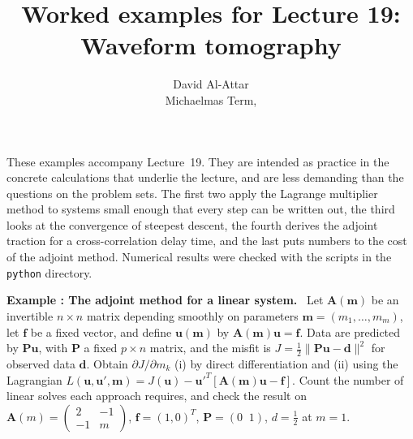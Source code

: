 \documentclass[a4paper,12pt]{paper}
\title{Worked examples for Lecture 19: Waveform tomography}
\author{David Al-Attar \\ Michaelmas Term, \the\year}
\newcounter{example}
\renewenvironment{example}[1]{%
  \refstepcounter{example}%
  \begin{mdframed}[linewidth=1pt,innertopmargin=6pt,innerbottommargin=6pt]%
  \noindent\textbf{Example \theexample: #1.}\ }{%
  \end{mdframed}}
\begin{document}
\maketitle

\noindent These examples accompany Lecture~19. They are intended as practice in the concrete
calculations that underlie the lecture, and are less demanding than the questions on the
problem sets. The first two apply the Lagrange multiplier method to systems small enough that every
step can be written out, the third looks at the convergence of steepest descent, the fourth derives the
adjoint traction for a cross-correlation delay time, and the last puts numbers to the cost of the adjoint
method. Numerical results were checked with the scripts in the \texttt{python} directory.

\begin{example}{The adjoint method for a linear system}
Let $\mathbf{A}(\mathbf{m})$ be an invertible $n\times n$ matrix depending smoothly on parameters
$\mathbf{m}=(m_{1},\dots,m_{m})$, let $\mathbf{f}$ be a fixed vector, and define $\mathbf{u}(\mathbf{m})$ by
$\mathbf{A}(\mathbf{m})\mathbf{u}=\mathbf{f}$. Data are predicted by $\mathbf{P}\mathbf{u}$, with $\mathbf{P}$ a fixed
$p\times n$ matrix, and the misfit is $J=\frac{1}{2}\|\mathbf{P}\mathbf{u}-\mathbf{d}\|^{2}$ for observed
data $\mathbf{d}$. Obtain $\partial J/\partial m_{k}$ (i) by direct differentiation and (ii) using the Lagrangian
$L(\mathbf{u},\mathbf{u}',\mathbf{m})=J(\mathbf{u})-\mathbf{u}'^{T}[\mathbf{A}(\mathbf{m})\mathbf{u}-\mathbf{f}]$.
Count the number of linear solves each approach requires, and check the result on
$\mathbf{A}(m)=\begin{pmatrix}2&-1\\-1&m\end{pmatrix}$, $\mathbf{f}=(1,0)^{T}$, $\mathbf{P}=(0\;\;1)$, $d=\frac{1}{2}$ at $m=1$.
\end{example}
\end{document}
